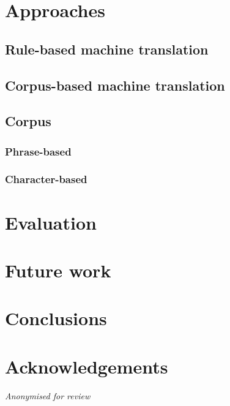 \documentclass[11pt]{article}
\begin{document}
\section{Approaches}

\subsection{Rule-based machine translation}

\subsection{Corpus-based machine translation}

\subsection{Corpus}

\subsubsection{Phrase-based}

\subsubsection{Character-based }

\section{Evaluation}

\section{Future work}

\section{Conclusions}

\section*{Acknowledgements}

\emph{Anonymised for review}



\end{document}
